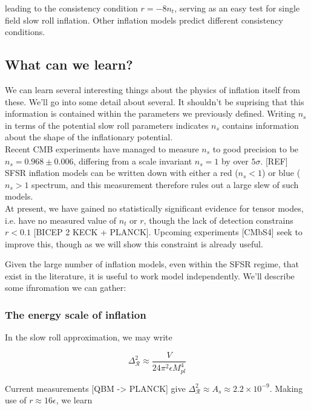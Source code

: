\documentclass[a4paper,11pt]{article}
\newcommand{\Mp}{M_{pl}}
\begin{document}
leading to the consistency condition $r=-8n_t$, serving as an easy test for single field slow roll inflation. Other inflation models predict different consistency conditions.


\subsection{What can we learn?}
We can learn several interesting things about the physics of inflation itself from these. We'll go into some detail about several. It shouldn't be suprising that this information is contained within the parameters we previously defined. Writing $n_s$ in terms of the potential slow roll parameters indicates $n_s$ contains information about the shape of the inflationary potential.\\ 

Recent CMB experiments have managed to measure $n_s$ to good precision to be $n_s=0.968\pm0.006$, differing from a scale invariant $n_s=1$ by over $5\sigma$. [REF] SFSR inflation models can be written down with either a red ($n_s<1$) or blue ($n_s>1$ spectrum, and this measurement therefore rules out a large slew of such models. \\

At present, we have gained no statistically significant evidence for tensor modes, i.e. have no measured value of $n_t$ or $r$, though the lack of detection constrains $r<0.1$ [BICEP 2 KECK + PLANCK]. Upcoming experiments [CMbS4] seek to improve this, though as we will show this constraint is already useful. 

Given the large number of inflation models, even within the SFSR regime, that exist in the literature, it is useful to work model independently. We'll describe some ifnromation we can gather:

\subsubsection{The energy scale of inflation}

In the slow roll approximation, we may write 

\begin{equation}
\Delta^2_{\mathcal{R}}\approx \frac{V}{24\pi^2\epsilon\Mp^4}
\end{equation}

Current measurements [QBM -> PLANCK] give $\Delta^2_{\mathcal{R}} \approx A_s \approx 2.2\times10^{-9}$. Making use of $r\approx 16\epsilon$, we learn
\end{document}
